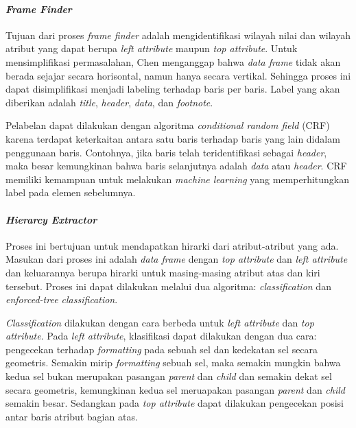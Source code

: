         \paragraph{\textit{Frame Finder}}
        Tujuan dari proses \textit{frame finder} adalah mengidentifikasi wilayah nilai dan wilayah atribut yang dapat berupa \textit{left attribute} maupun \textit{top attribute}. Untuk mensimplifikasi permasalahan, Chen menganggap bahwa \textit{data frame} tidak akan berada sejajar secara horisontal, namun hanya secara vertikal. Sehingga proses ini dapat disimplifikasi menjadi labeling terhadap baris per baris. Label yang akan diberikan adalah \textit{title}, \textit{header}, \textit{data}, dan \textit{footnote}.

        Pelabelan dapat dilakukan dengan algoritma \textit{conditional random field} (CRF) karena terdapat keterkaitan antara satu baris terhadap baris yang lain didalam penggunaan baris. Contohnya, jika baris telah teridentifikasi sebagai \textit{header}, maka besar kemungkinan bahwa baris selanjutnya adalah \textit{data} atau \textit{header}. CRF memiliki kemampuan untuk melakukan \textit{machine learning} yang memperhitungkan label pada elemen sebelumnya.

        \paragraph{\textit{Hierarcy Extractor}}
        Proses ini bertujuan untuk mendapatkan hirarki dari atribut-atribut yang ada. Masukan dari proses ini adalah \textit{data frame} dengan \textit{top attribute} dan \textit{left attribute} dan keluarannya berupa hirarki untuk masing-masing atribut atas dan kiri tersebut. Proses ini dapat dilakukan melalui dua algoritma: \textit{classification} dan \textit{enforced-tree classification}.

        \textit{Classification} dilakukan dengan cara berbeda untuk \textit{left attribute} dan \textit{top attribute}. Pada \textit{left attribute}, klasifikasi dapat dilakukan dengan dua cara: pengecekan terhadap \textit{formatting} pada sebuah sel dan kedekatan sel secara geometris. Semakin mirip \textit{formatting} sebuah sel, maka semakin mungkin bahwa kedua sel bukan merupakan pasangan \textit{parent} dan \textit{child} dan semakin dekat sel secara geometris, kemungkinan kedua sel meruapakan  pasangan \textit{parent} dan \textit{child} semakin besar. Sedangkan pada \textit{top attribute} dapat dilakukan pengecekan posisi antar baris atribut bagian atas.

